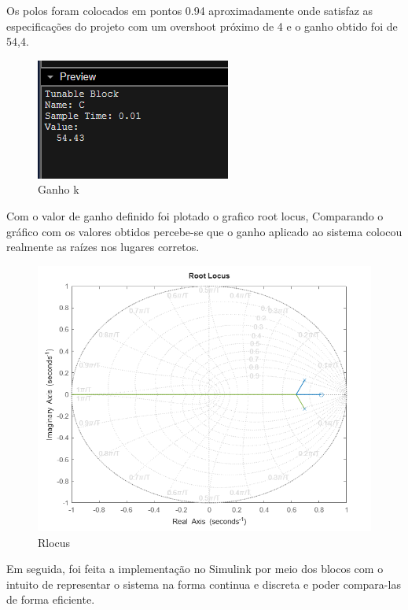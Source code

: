\documentclass[a4paper, 12pt]{article}
\begin{document}
    Os polos foram colocados em pontos 0.94 aproximadamente onde satisfaz as especificações do projeto com um overshoot próximo de 4 e o ganho obtido foi de 54,4. 
\begin{figure}[H]
    \centering
    \includegraphics[width=0.5\linewidth]{DoTheL.png}
    \caption{Ganho k}
    \label{fig:enter-label}
\end{figure}

    Com o valor de ganho definido foi plotado o grafico root locus, Comparando o gráfico com os valores obtidos percebe-se que o ganho aplicado ao sistema colocou realmente as raízes nos lugares corretos.
    
\begin{figure}[H]
    \centering
    \includegraphics[width=0.9\linewidth]{MakeTheL.png}
    \caption{Rlocus}
    \label{fig:enter-label}
\end{figure}

    Em seguida, foi feita a implementação no Simulink por meio dos blocos com o intuito de representar o sistema na forma continua e discreta e poder compara-las de forma eficiente.
    
    
\end{document}
